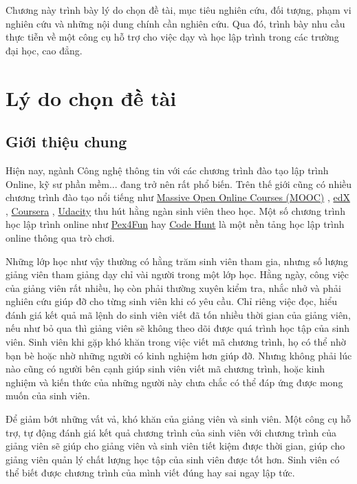 
Chương này trình bày lý do chọn đề tài, mục tiêu nghiên cứu, đối tượng, phạm vi nghiên cứu và những nội dung chính cần nghiên cứu. Qua đó, trình bày nhu cầu thực tiễn về một công cụ hỗ trợ cho việc dạy và học lập trình trong các trường đại học, cao đẳng.

\section{Lý do chọn đề tài}

\subsection{Giới thiệu chung}

Hiện nay, ngành Công nghệ thông tin với các chương trình đào tạo lập trình Online, kỹ sư phần mềm... đang trở nên rất phổ biến. Trên thế giới cũng có nhiều chương trình đào tạo nổi tiếng như \href{https://www.coursera.org/course/saas}{Massive Open Online Courses (MOOC)} \cite{mooc}, \href{https://www.edx.org/}{edX} \cite{edx}, \href{https://www.coursera.org/}{Coursera} \cite{coursera}, \href{http://www.udacity.com/}{Udacity} \cite{Udacity} thu hút hằng ngàn sinh viên theo học. Một số chương trình học lập trình online như \href{https://www.pexforfun.com/}{Pex4Fun} \cite{Pex4Fun} hay \href{https://www.microsoft.com/en-us/research/project/code-hunt/}{Code Hunt} \cite{CodeHunt} là một nền tảng học lập trình online thông qua trò chơi. 

Những lớp học như vậy thường có hằng trăm sinh viên tham gia, nhưng số lượng giảng viên tham giảng dạy chỉ vài người trong một lớp học. Hằng ngày, công việc của giảng viên rất nhiều, họ còn phải thường xuyên kiểm tra, nhắc nhở và phải nghiên cứu giúp đỡ cho từng sinh viên khi có yêu cầu. Chỉ riêng việc đọc, hiểu đánh giá kết quả mã lệnh do sinh viên viết đã tốn nhiều thời gian của giảng viên, nếu như bỏ qua thì giảng viên sẽ không theo dõi được quá trình học tập của sinh viên. Sinh viên khi gặp khó khăn trong việc viết mã chương trình, họ có thể nhờ bạn bè hoặc nhờ những người có kinh nghiệm hơn giúp đỡ. Nhưng không phải lúc nào cũng có người bên cạnh giúp sinh viên viết mã chương trình, hoặc kinh nghiệm và kiến thức của những người này chưa chắc có thể đáp ứng được mong muốn của sinh viên.

Để giảm bớt những vất vả, khó khăn của giảng viên và sinh viên. Một công cụ hỗ trợ, tự động đánh giá kết quả chương trình của sinh viên với chương trình của giảng viên sẽ giúp cho giảng viên và sinh viên tiết kiệm được thời gian, giúp cho giảng viên quản lý chất lượng học tập của sinh viên được tốt hơn. Sinh viên có thể biết được chương trình của mình viết đúng hay sai ngay lập tức. 

